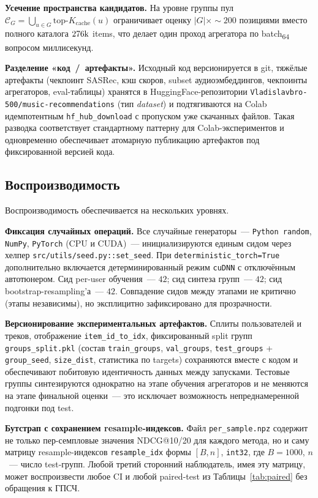 \textbf{Усечение пространства кандидатов.} На уровне группы пул $\mathcal{C}_G = \bigcup_{u \in G} \mathrm{top}\text{-}K_{\mathrm{cache}}(u)$ ограничивает оценку $|G| \times \sim$$200$ позициями вместо полного каталога $276{\rm k}$ items, что делает один проход агрегатора по batch\textsubscript{64} вопросом миллисекунд.

\textbf{Разделение «код~/~артефакты».} Исходный код версионируется в git, тяжёлые артефакты (чекпоинт SASRec, кэш скоров, subset аудиоэмбеддингов, чекпоинты агрегаторов, eval-таблицы) хранятся в HuggingFace-репозитории \texttt{Vladislavbro-500/music-recommendations} (тип \emph{dataset}) и подтягиваются на Colab идемпотентным \texttt{hf\_hub\_download} с пропуском уже скачанных файлов. Такая разводка соответствует стандартному паттерну для Colab-экспериментов и одновременно обеспечивает атомарную публикацию артефактов под фиксированной версией кода.

\subsection{Воспроизводимость}\label{subsec:ch3:reproducibility}

Воспроизводимость обеспечивается на нескольких уровнях.

\textbf{Фиксация случайных операций.} Все случайные генераторы~--- \texttt{Python random}, \texttt{NumPy}, \texttt{PyTorch} (CPU и CUDA)~--- инициализируются единым сидом через хелпер \texttt{src/utils/seed.py::set\_seed}. При \texttt{deterministic\_torch=True} дополнительно включается детерминированный режим \texttt{cuDNN} с отключённым автотюнером. Сид per-user обучения~--- $42$; сид синтеза групп~--- $42$; сид bootstrap-resampling'а~--- $42$. Совпадение сидов между этапами не критично (этапы независимы), но эксплицитно зафиксировано для прозрачности.

\textbf{Версионирование экспериментальных артефактов.} Сплиты пользователей и треков, отображение \texttt{item\_id\_to\_idx}, фиксированный split групп \texttt{groups\_split.pkl} (состав \texttt{train\_groups}, \texttt{val\_groups}, \texttt{test\_groups} + \texttt{group\_seed}, \texttt{size\_dist}, статистика по targets) сохраняются вместе с кодом и обеспечивают побитовую идентичность данных между запусками. Тестовые группы синтезируются однократно на этапе обучения агрегаторов и не меняются на этапе финальной оценки~--- это исключает возможность непреднамеренной подгонки под test.

\textbf{Бутстрап с сохранением resample-индексов.} Файл \texttt{per\_sample.npz} содержит не только пер-семпловые значения NDCG@10/20 для каждого метода, но и саму матрицу resample-индексов \texttt{resample\_idx} формы $[B, n]$, \texttt{int32}, где $B = 1000$, $n$~--- число test-групп. Любой третий сторонний наблюдатель, имея эту матрицу, может воспроизвести любое CI и любой paired-test из Таблицы~\ref{tab:paired} без обращения к ГПСЧ.

